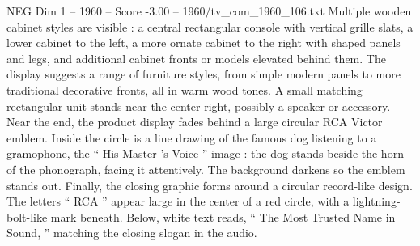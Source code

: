 \begin{textsample}{NEG Dim 1 – 1960 – Score -3.00 – 1960/tv\_com\_1960\_106.txt}
Multiple wooden cabinet styles are visible : a central rectangular console with vertical grille slats, a lower cabinet to the left, a more ornate cabinet to the right with shaped panels and legs, and additional cabinet fronts or models elevated behind them.
The display suggests a range of furniture styles, from simple modern panels to more traditional decorative fronts, all in warm wood tones.
A small matching rectangular unit stands near the center-right, possibly a speaker or accessory.
Near the end, the product display fades behind a large circular RCA Victor emblem.
Inside the circle is a line drawing of the famous dog listening to a gramophone, the “ His Master ’s Voice ” image : the dog stands beside the horn of the phonograph, facing it attentively.
The background darkens so the emblem stands out.
Finally, the closing graphic forms around a circular record-like design.
The letters “ RCA ” appear large in the center of a red circle, with a lightning-bolt-like mark beneath.
Below, white text reads, “ The Most Trusted Name in Sound, ” matching the closing slogan in the audio.

\end{textsample}
